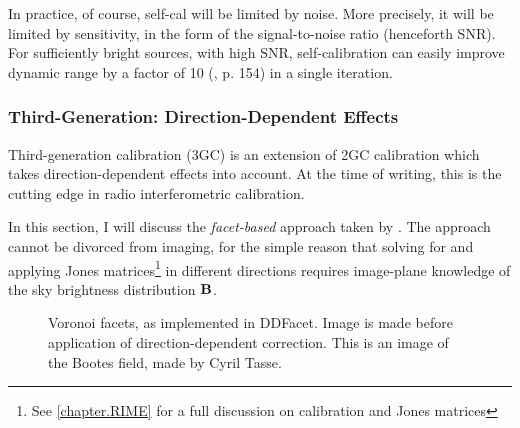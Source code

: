\pg
In practice, of course, self-cal will be limited by noise. More precisely, it will be limited by sensitivity, in the form of the signal-to-noise ratio (henceforth SNR). For sufficiently bright sources, with high SNR, self-calibration can easily improve dynamic range by a factor of 10 (\cite{serendipitous}, p. 154) in a single iteration. 

\subsubsection{Third-Generation: Direction-Dependent Effects}

\pg
Third-generation calibration (3GC) is an extension of 2GC calibration which takes direction-dependent effects into account. At the time of writing, this is the cutting edge in radio interferometric calibration.

\pg
In this section, I will discuss the \emph{facet-based} approach taken by . The approach cannot be divorced from imaging, for the simple reason that solving for and applying Jones matrices\footnote{See \cref{chapter.RIME} for a full discussion on calibration and Jones matrices} in different directions requires image-plane knowledge of the sky brightness distribution $\textbf{B}$. %

\begin{figure}[ht]
\centering
{}
\caption{\label{fig.facets} Voronoi facets, as implemented in DDFacet. Image is made before application of direction-dependent correction. This is an image of the Bootes field, made by Cyril Tasse.}
\end{figure}

